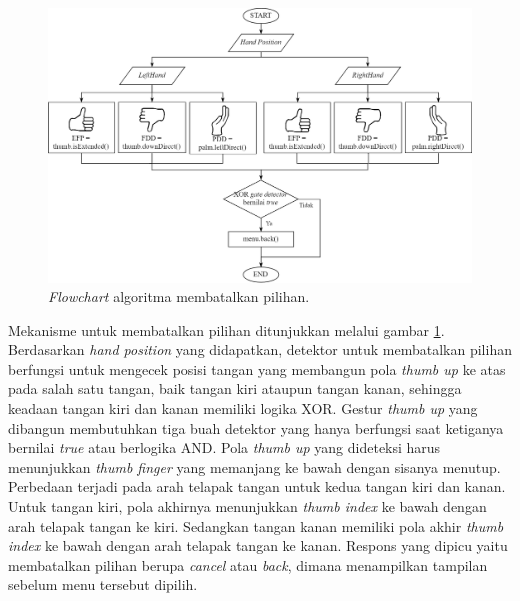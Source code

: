 		 	\begin{figure} [H]
		 		\includegraphics[width=\textwidth]{img/bab3/flow_batal.png}
		 		\caption{\textit{Flowchart} algoritma membatalkan pilihan.}
		 		\label{fig:flow_batal}
		 	\end{figure}
	 		\vspace{-2ex}
	 		Mekanisme untuk membatalkan pilihan ditunjukkan melalui gambar \ref{fig:flow_batal}. Berdasarkan \textit{hand position} yang didapatkan, detektor untuk membatalkan pilihan berfungsi untuk mengecek posisi tangan yang membangun pola \textit{thumb up} ke atas pada salah satu tangan, baik tangan kiri ataupun tangan kanan, sehingga keadaan tangan kiri dan kanan memiliki logika XOR. Gestur \textit{thumb up} yang dibangun membutuhkan tiga buah detektor yang hanya berfungsi saat ketiganya bernilai \textit{true} atau berlogika AND. Pola \textit{thumb up} yang dideteksi harus menunjukkan \textit{thumb finger} yang memanjang ke bawah dengan sisanya menutup. Perbedaan terjadi pada arah telapak tangan untuk kedua tangan kiri dan kanan. Untuk tangan kiri, pola akhirnya menunjukkan \textit{thumb index} ke bawah dengan arah telapak tangan ke kiri. Sedangkan tangan kanan memiliki pola akhir \textit{thumb index} ke bawah dengan arah telapak tangan ke kanan. Respons yang dipicu yaitu membatalkan pilihan berupa \textit{cancel} atau \textit{back}, dimana menampilkan tampilan sebelum menu tersebut dipilih.
	 		
